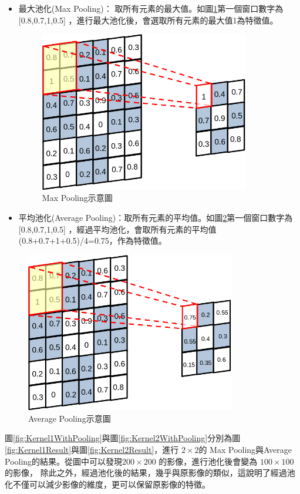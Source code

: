 \begin{itemize}
	\item
	      最大池化(Max Pooling)：
	      取所有元素的最大值。如圖\ref{fig:MaxPooling}第一個窗口數字為[0.8,0.7,1,0.5] ，進行最大池化後，會選取所有元素的最大值1為特徵值。
	      \begin{figure}[H]
		      \centerline{\includegraphics[height=7cm]{./pic/PG7HfVgc.png}}
		      \caption{Max Pooling示意圖}
		      \label{fig:MaxPooling}
	      \end{figure}

	      \newpage
	\item

	      平均池化(Average Pooling)：取所有元素的平均值。如圖\ref{fig:AveragePooling}第一個窗口數字為[0.8,0.7,1,0.5] ，經過平均池化，會取所有元素的平均值(0.8+0.7+1+0.5)/4=0.75，作為特徵值。
\end{itemize}

\begin{figure}[H]
	\centerline{\includegraphics[height=7cm]{./pic/Ec3pr3VH.png}}
	\caption{Average Pooling示意圖}
	\label{fig:AveragePooling}
\end{figure}


圖\ref{fig:Kernel1WithPooling}與圖\ref{fig:Kernel2WithPooling}分別為圖\ref{fig:Kernel1Result}與圖\ref{fig:Kernel2Result}，進行 \(2 \times 2\)的 Max Pooling與Average Pooling的結果。從圖中可以發現\(200 \times 200\) 的影像，進行池化後會變為 \(100 \times 100\)的影像，
除此之外，經過池化後的結果，幾乎與原影像的類似，這說明了經過池化不僅可以減少影像的維度，更可以保留原影像的特徵。

